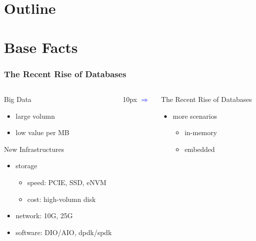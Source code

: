 \documentclass[lualatex]{beamer}
\begin{document}
\section*{Outline}
\frame{\tableofcontents}

\section{Base Facts}

\begin{frame}
  \frametitle{The Recent Rise of Databases}
  \begin{columns}
    \begin{column}{0.4\textwidth}
      \begin{block}{Big Data}
        \begin{itemize}
          \item large volumn
          \item low value per MB
        \end{itemize}
      \end{block}
      \begin{block}{New Infrastructures}
        \begin{itemize}
          \item storage
            \begin{itemize}
              \item speed: PCIE, SSD, eNVM
              \item cost: high-volumn disk
            \end{itemize}
          \item network: 10G, 25G
          \item software: DIO/AIO, dpdk/spdk
        \end{itemize}
      \end{block}
    \end{column}
    \begin{column}{10px}
      \Large \textcolor{blue}{$\Rightarrow$}
    \end{column}
    \begin{column}{0.45\textwidth}
      \begin{exampleblock}{The Recent Rise of Databases}
        \begin{itemize}
          \item more scenarios
            \begin{itemize}
              \item in-memory
              \item embedded

\end{itemize}
\end{itemize}
\end{exampleblock}
\end{column}
\end{columns}
\end{frame}
\end{document}
